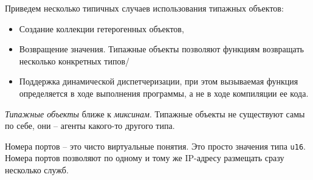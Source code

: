 \documentclass[%
	11pt,
	a4paper,
	utf8,
		]{article}
\begin{document}
Приведем несколько типичных случаев использования типажных объектов:
\begin{itemize}
	\item Создание коллекции гетерогенных объектов,
	
	\item Возвращение значения. Типажные объекты позволяют функциям возвращать несколько конкретных типов/
	
	\item Поддержка динамической диспетчеризации, при этом вызываемая функция определяется в ходе выполнения программы, а не в ходе компиляции ее кода.
\end{itemize}

{\color{blue}
\emph{Типажные объекты} ближе к \emph{миксинам}. Типажные объекты не существуют самы по себе, они -- агенты какого-то другого типа.
}

Номера портов -- это чисто виртуальные понятия. Это просто значения типа \verb|u16|. Номера портов позволяют по одному и тому же IP-адресу размещать сразу несколько служб.
\end{document}
